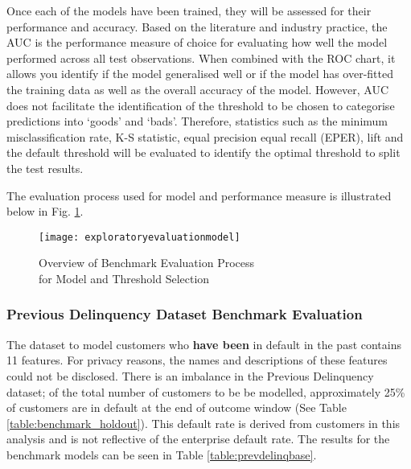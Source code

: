 Once each of the models have been trained, they will be assessed for their performance and accuracy. Based on the literature and industry practice, the AUC is the performance measure of choice for evaluating how well the model performed across all test observations. When combined with the ROC chart, it allows you identify if the model generalised well or if the model has over-fitted the training data as well as the overall accuracy of the model. However, AUC does not facilitate the identification of the threshold
to be chosen to categorise predictions into `goods' and `bads'. Therefore, statistics such as the minimum misclassification rate, K-S statistic, equal precision equal recall (EPER), lift and the default threshold will be evaluated to identify the optimal threshold to split the test results.

The evaluation process used for model and performance measure is illustrated below in Fig. \ref{fig:exploratoryevaluationmodel}. 

\begin{figure}[H]
	\texttt{[image: exploratoryevaluationmodel]}
	\caption{Overview of Benchmark Evaluation Process\\for Model and Threshold Selection}
	\label{fig:exploratoryevaluationmodel}
\end{figure}

\subsubsection{Previous Delinquency Dataset Benchmark Evaluation}

The dataset to model customers who \textbf{have been} in default in the past contains 11 features. For privacy reasons, the names and descriptions of these features could not be disclosed. There is an imbalance in the Previous Delinquency dataset; of the total number of customers to be be modelled, approximately 25\% of customers are in default at the end of outcome window (See Table \ref{table:benchmark_holdout}). This default rate is derived from customers in this analysis and is not reflective of the enterprise default rate. The results for the benchmark models can be seen in Table \ref{table:prevdelinqbase}.

